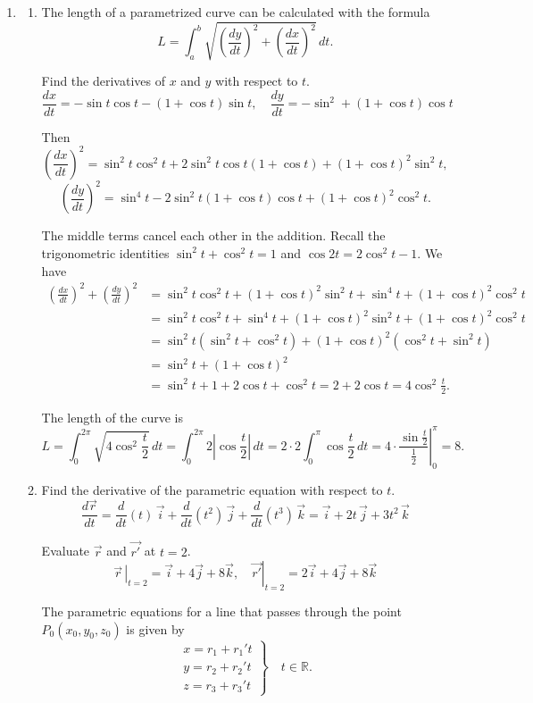 \documentclass[a4paper, 12pt]{article}
\begin{document}
\begin{enumerate}[leftmargin=*,label=\textbf{\arabic*.}]
\item \begin{enumerate}[leftmargin=*,label=\textbf{\alph*.}]
\item The length of a parametrized curve can be calculated with the formula
\[L=\int_a^b\sqrt{\left(\frac{dy}{dt}\right)^2+\left(\frac{dx}{dt}\right)^2}\,dt.\]

Find the derivatives of $x$ and $y$ with respect to $t$.
\[\frac{dx}{dt}=-\sin t\cos t - (1+\cos t)\sin t, \quad \frac{dy}{dt}=-\sin^2 + (1+\cos t)\cos t\]

Then
\[\left(\frac{dx}{dt}\right)^2=\sin^2t\cos^2t+2\sin^2t\cos t(1+\cos t)+(1+\cos t)^2\sin^2t,\]
\[\left(\frac{dy}{dt}\right)^2=\sin^4t-2\sin^2t(1+\cos t)\cos t+(1+\cos t)^2\cos ^2 t.\]

The middle terms cancel each other in the addition. Recall the trigonometric identities $\sin^2t+\cos^2t=1$ and $\cos 2t=2\cos^2 t-1$. We have
\begin{align*}\left(\frac{dx}{dt}\right)^2+\left(\frac{dy}{dt}\right)^2&=\sin^2t\cos^2t+(1+\cos t)^2\sin^2t+\sin^4t+(1+\cos t)^2\cos^2t\\[1em]&=\sin^2t\cos^2t+\sin^4t+(1+\cos t)^2\sin^2t+(1+\cos t)^2\cos^2t\\[1em]&=\sin^2t(\sin^2t+\cos^2t)+(1+\cos t)^2(\cos^2t+\sin^2t)\\[1em]&=\sin^2t+(1+\cos t)^2\\[1em]&=\sin^2t+1+2\cos t+\cos^2t=2+2\cos t =4\cos^2\frac t2.\end{align*}

The length of the curve is
\[L=\int_{0}^{2\pi}\sqrt{4\cos^2\frac t2}\,dt=\int_0^{2\pi}2\left|\cos\frac t2\right|\,dt=2\cdot 2\int_0^{\pi}\cos\frac t2\,dt=\left.4\cdot\frac{\sin\frac t2}{\frac12}\right|_0^\pi=\boxed8.\]

\item Find the derivative of the parametric equation with respect to $t$.
\[\frac{d\vec r}{dt}=\frac d{dt}\left(t\right)\,\vec i+\frac d{dt}\left(t^2\right)\,\vec j+\frac d{dt}\left(t^3\right)\,\vec k=\vec i+ 2t\,\vec j+3t^2\,\vec k\]

Evaluate $\vec r$ and $\vec {r'}$ at $t=2$.
\[\left.\vec r\,\right|_{t=2}=\vec i+ 4\vec j+8\vec k,\quad \left.\vec{r'}\right|_{t=2}=2\vec i+4\vec j+8\vec k\]

The parametric equations for a line that passes through the point $P_0(x_0,y_0,z_0)$ is given by
\[\left.\begin{array}{c}
x=r_1+r_1't\\
y=r_2+r_2't\\
z=r_3+r_3't
\end{array}\right\}\quad t\in\mathbb{R}.\]


\end{enumerate}
\end{enumerate}
\end{document}
